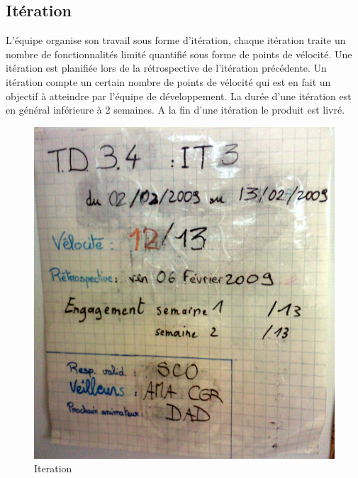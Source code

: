 \documentclass[12pt,oneside]{book}
\begin{document}
\subsection{Itération}
L'équipe organise son travail sous forme d'itération, chaque itération traite un nombre de fonctionnalités limité quantifié sous forme de points de vélocité. Une itération est planifiée lors de la rétrospective de l'itération précédente. Un itération compte un certain nombre de points de vélocité qui est en fait un objectif à atteindre par l'équipe de développement. La durée d'une itération est en général inférieure à 2 semaines. A la fin d'une itération le produit est livré.
\begin{figure}[!h]
\centering
\includegraphics[scale=0.10]{Illustrations/SP_A0182.jpg}
\caption{Iteration}
\label{fig:Iteration}
\end{figure}
\end{document}
